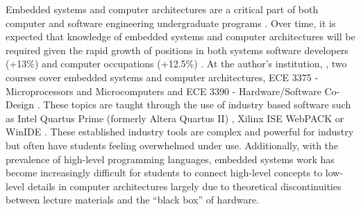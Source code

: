 \begin{comment}
\item Has anyone else done anything similar?
\begin{itemize}
\item Yes. 
\end{itemize}
\item Is your research relevant to research/practice/theory in your field?
\begin{itemize}
\item Education is always required
\item Improvements are required as IoT increases and devices are moving back towards small
microelectronics
\end{itemize}
\item What is already known or understood about this topic?
\begin{itemize}
\item Simulations: \cite{Tappan2009}, \cite{Skrien2001}, \cite{Skillen2011}
\item Curriculum: 
\end{itemize}
\item How might your research add to this understanding, or challenge existing theories and beliefs?
\begin{itemize}
\item Extend on existing solution
\item Propose opportunity to replace multiple configurations, not a single one
\end{itemize}
\end{itemize}
\end{comment}

Embedded systems and computer architectures are a critical part of both computer and software engineering undergraduate programs \cite{cec2016, sec2015, ece-ce-program, Ristov2011, Stolikj2011}. Over time, it is expected that knowledge of embedded systems and computer architectures will be required given the rapid growth of positions in both systems software developers (+13\%) and computer occupations (+12.5\%) \cite{bls2014}. At the author's institution, \uwo{}, two courses cover embedded systems and computer architectures, ECE 3375 - Microprocessors and Microcomputers and ECE 3390 - Hardware/Software Co-Design \cite{eceOutlines}. These topics are taught through the use of industry based software such as Intel Quartus Prime (formerly Altera Quartus II) \cite{quartus}, Xilinx ISE WebPACK \cite{xilinxISE} or WinIDE \cite{winide}. These established industry tools are complex and powerful for industry but often have students feeling overwhelmed under use. Additionally, with the prevalence of high-level programming languages, embedded systems work has become increasingly difficult for students to connect high-level concepts to low-level details in computer architectures largely due to theoretical discontinuities between lecture materials and the ``black box'' of hardware. 

